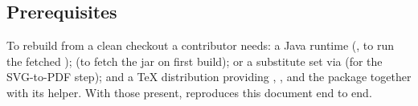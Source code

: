 \subsection{Prerequisites}

To rebuild from a clean checkout a contributor needs: a Java runtime (, to run
the fetched );  (to fetch the jar on first build);
 or a substitute set via  (for the SVG-to-PDF step); and a
\TeX{} distribution providing , , and the  package
together with its  helper. With those present,  reproduces this
document end to end.
